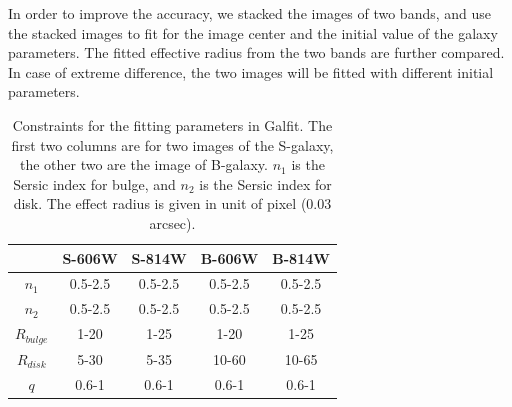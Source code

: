 \documentclass[useAMS,usenatbib]{mn2e}
\begin{document}
In order to improve the accuracy, we stacked the images of two bands,
and use the stacked images to fit for the image center and the initial
value of the galaxy parameters. The fitted effective radius from the two
bands are further compared. In case of extreme difference,
the two images will be fitted with different initial parameters. %

%
\begin{center}
\begin{table}
\begin{tabular}{|c|c|c|c|c|}
\hline\hline
 &S-606W  & S-814W  & B-606W & B-814W \\ \hline
$n_1$ &0.5-2.5  &0.5-2.5  &0.5-2.5 &0.5-2.5 \\ \hline
$n_2$ &0.5-2.5  &0.5-2.5  &0.5-2.5 &0.5-2.5 \\ \hline
$R_{bulge}$ &1-20 &1-25  &1-20  &1-25  \\ \hline
$R_{disk}$  &5-30 &5-35  &10-60 &10-65 \\ \hline
$q$      &0.6-1  &0.6-1  &0.6-1 &0.6-1 \\ \hline
\hline
\end{tabular}
\caption{\label{fitpar} Constraints for the fitting parameters in Galfit.
The first two columns are for two images of the S-galaxy, the other two are
the image of B-galaxy.
$n_1$ is the Sersic index for bulge, and $n_2$ is the Sersic index for disk.
The effect radius is given in unit of pixel ($0.03$ arcsec).}
\end{table}
\end{center}
%
\end{document}
